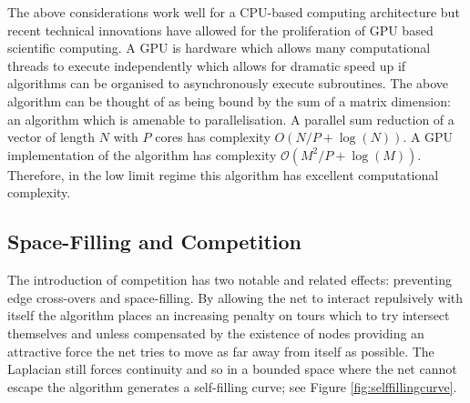 The above considerations work well for a CPU-based computing architecture but recent technical innovations have allowed for the proliferation of GPU based scientific computing. A GPU is hardware which allows many computational threads to execute independently which allows for dramatic speed up if algorithms can be organised to asynchronously execute subroutines. The above algorithm can be thought of as being bound by the sum of a matrix dimension: an algorithm which is amenable to parallelisation. A parallel sum reduction of a vector of length $N$ with $P$ cores has complexity $O(N/P + \log(N))$. A GPU implementation of the algorithm has complexity $\mathcal{O}(M^2/P +  \log(M) )$. Therefore, in the low limit regime this algorithm has excellent computational complexity.
\subsection{Space-Filling and Competition \label{sec:competition}}
The introduction of competition has two notable and related effects: preventing edge cross-overs and space-filling. By allowing the net to interact repulsively with itself the algorithm places an increasing penalty on tours which to try intersect themselves and unless compensated by the existence of nodes providing an attractive force the net tries to move as far away from itself as possible. The Laplacian still forces continuity and so in a bounded space where the net cannot escape the algorithm generates a self-filling curve; see Figure \ref{fig:selffillingcurve}.

